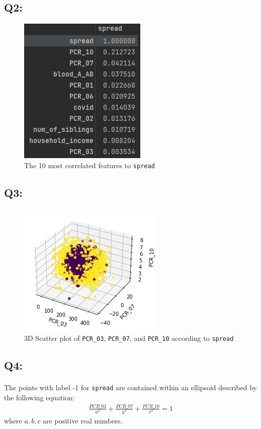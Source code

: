 \documentclass{article}
\newcommand{\code}[1]{\texttt{#1}}
\begin{document}
\subsection*{Q2:}
    \begin{figure}[H]
        \centering
        \includegraphics{images/q2.png}
        \caption{The 10 most correlated features to \code{spread}}
    \end{figure}
\subsection*{Q3:}
    \begin{figure}[H]
        \centering
        \includegraphics{images/q3.png}
        \caption{3D Scatter plot of \code{PCR\_03}, \code{PCR\_07}, and \code{PCR\_10} according to \code{spread}}
        \label{fig:q3}
    \end{figure}
\subsection*{Q4:}
    \paragraph*{}
    The points with label -1 for \code{spread} are contained within an ellipsoid described by the following equation:
    \begin{align*}
        \frac{PCR\_03}{a^2} + \frac{PCR\_07}{b^2} + \frac{PCR\_10}{c^2} = 1
    \end{align*}
    where $a,b,c$ are positive real numbers.
\end{document}
